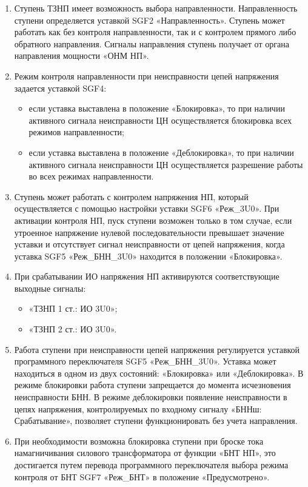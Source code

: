 \begin{enumerate}
\begin{enumerate}
\item
Ступень ТЗНП имеет возможность выбора направленности. Направленность ступени определяется уставкой SGF2 «Направленность».  Ступень может работать как без контроля направленности, так и с контролем прямого либо обратного направления. Сигналы направления ступень получает от органа направления мощности «ОНМ НП».

\item
Режим контроля направленности при неисправности цепей напряжения задается уставкой SGF4:
\begin{itemize}
    \item если уставка выставлена в положение «Блокировка», то при наличии активного сигнала неисправности ЦН осуществляется блокировка всех режимов направленности; 
    \item если уставка выставлена в положение «Деблокировка», то при наличии активного сигнала неисправности ЦН осуществляется разрешение работы во всех режимах направленности. 
\end{itemize}

\item
Ступень может работать с контролем напряжения НП, который осуществляется с помощью настройки уставки SGF6 «Реж\_3U0». При активации контроля НП, пуск ступени возможен только в том случае, если утроенное напряжение нулевой последовательности превышает значение уставки и отсутствует сигнал неисправности от цепей напряжения, когда уставка SGF5 «Реж\_БНН\_3U0» находится в положении «Блокировка».

\item
При срабатывании ИО напряжения НП активируются соответствующие выходные сигналы:
\begin{itemize}
    \item «ТЗНП 1 ст.: ИО 3U0»;
    \item «ТЗНП 2 ст.: ИО 3U0».
\end{itemize}

\item
Работа ступени при неисправности цепей напряжения регулируется уставкой программного переключателя SGF5 «Реж\_БНН\_3U0». Уставка может находиться в одном из двух состояний: «Блокировка» или «Деблокировка». В режиме блокировки работа ступени запрещается до момента исчезновения неисправности БНН. В режиме деблокировки появление неисправности в цепях напряжения, контролируемых по входному сигналу «БННш: Срабатывание», позволяет ступени функционировать без учета направления.

\item
При необходимости возможна блокировка ступени при броске тока намагничивания силового трансформатора от функции «БНТ НП», это достигается путем перевода программного переключателя выбора режима контроля от БНТ SGF7 «Реж\_БНТ» в положение «Предусмотрено».


\end{enumerate}
\end{enumerate}
